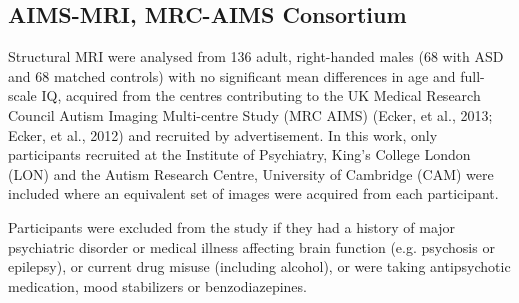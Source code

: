 \subsection{AIMS-MRI, MRC-AIMS Consortium}\label{sec:aims-mri}
Structural MRI were analysed from 136 adult, right-handed males (68 with ASD and 68 matched controls) with no significant mean differences in age and full-scale IQ, acquired from the centres contributing to the UK Medical Research Council Autism Imaging Multi-centre Study (MRC AIMS) (Ecker, et al., 2013; Ecker, et al., 2012) and recruited by advertisement. In this work, only participants recruited at the Institute of Psychiatry, King’s College London (LON) and the Autism Research Centre, University of Cambridge (CAM) were included where an equivalent set of images were acquired from each participant. 

Participants were excluded from the study if they had a history of major psychiatric disorder or medical illness affecting brain function (e.g. psychosis or epilepsy), or current drug misuse (including alcohol), or were taking antipsychotic medication, mood stabilizers or benzodiazepines. 

